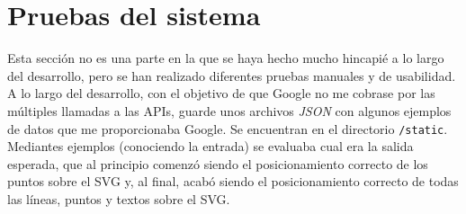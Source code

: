 \section{Pruebas del sistema}
Esta sección no es una parte en la que se haya hecho mucho hincapié a lo largo del desarrollo, pero se han realizado diferentes pruebas manuales y de usabilidad.
\\


A lo largo del desarrollo, con el objetivo de que Google no me cobrase por las múltiples llamadas a las APIs, guarde unos archivos \textit{JSON} con algunos ejemplos de datos que me proporcionaba Google. Se encuentran en el directorio \verb|/static|. Mediantes ejemplos (conociendo la entrada) se evaluaba cual era la salida esperada, que al principio comenzó siendo el posicionamiento correcto de los puntos sobre el SVG y, al final, acabó siendo el posicionamiento correcto de todas las líneas, puntos y textos sobre el SVG.




